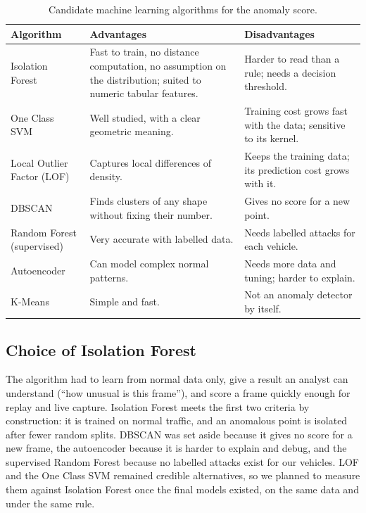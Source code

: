 \begin{table}[H]
\centering
\footnotesize
\caption{Candidate machine learning algorithms for the anomaly score.}
\label{tab:ml-comparison}
\begin{tabularx}{\textwidth}{|P{3.1cm}|Y|P{2.6cm}|}
\hline
\textbf{Algorithm} & \textbf{Advantages} & \textbf{Disadvantages} \\
\hline
Isolation Forest~\cite{liu2008isolation} & Fast to train, no distance computation, no assumption on the distribution; suited to numeric tabular features. & Harder to read than a rule; needs a decision threshold. \\
\hline
One Class SVM~\cite{scholkopf2001estimating} & Well studied, with a clear geometric meaning. & Training cost grows fast with the data; sensitive to its kernel. \\
\hline
Local Outlier Factor (LOF)~\cite{breunig2000lof} & Captures local differences of density. & Keeps the training data; its prediction cost grows with it. \\
\hline
DBSCAN~\cite{ester1996density} & Finds clusters of any shape without fixing their number. & Gives no score for a new point. \\
\hline
Random Forest (supervised) & Very accurate with labelled data. & Needs labelled attacks for each vehicle. \\
\hline
Autoencoder & Can model complex normal patterns. & Needs more data and tuning; harder to explain. \\
\hline
K-Means~\cite{macqueen1967methods} & Simple and fast. & Not an anomaly detector by itself. \\
\hline
\end{tabularx}
\normalsize
\end{table}

\subsection{Choice of Isolation Forest}

The algorithm had to learn from normal data only, give a result an analyst can understand (``how unusual is this frame''), and score a frame quickly enough for replay and live capture. Isolation Forest meets the first two criteria by construction: it is trained on normal traffic, and an anomalous point is isolated after fewer random splits. DBSCAN was set aside because it gives no score for a new frame, the autoencoder because it is harder to explain and debug, and the supervised Random Forest because no labelled attacks exist for our vehicles. LOF and the One Class SVM remained credible alternatives, so we planned to measure them against Isolation Forest once the final models existed, on the same data and under the same rule.

